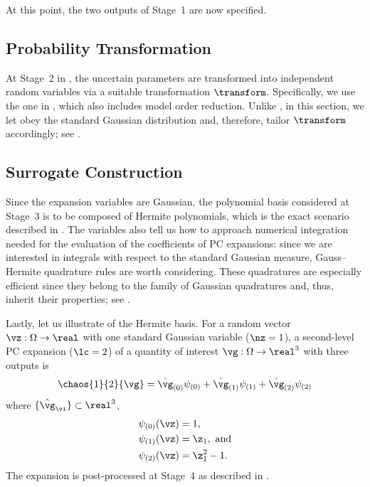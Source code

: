At this point, the two outputs of Stage~1 are now specified.

\subsection{Probability Transformation}

At Stage~2 in , the uncertain parameters \vu are
transformed into independent random variables \vz via a suitable transformation
$\transform$. Specifically, we use the one in ,
which also includes model order reduction. Unlike
, in this section, we let \vz obey the
standard Gaussian distribution and, therefore, tailor $\transform$ accordingly;
see .

\subsection{Surrogate Construction}

Since the expansion variables \vz are Gaussian, the polynomial basis considered
at Stage~3 is to be composed of Hermite polynomials, which is the exact scenario
described in . The variables also tell us how to approach
numerical integration needed for the evaluation of the coefficients of \ac{PC}
expansions: since we are interested in integrals with respect to the standard
Gaussian measure, Gauss--Hermite quadrature rules \cite{maitre2010} are worth
considering. These quadratures are especially efficient since they belong to the
family of Gaussian quadratures and, thus, inherit their properties; see
.

Lastly, let us illustrate of the Hermite basis. For a random vector $\vz: \Omega
\to \real$ with one standard Gaussian variable ($\nz = 1$), a second-level
\ac{PC} expansion ($\lc = 2$) of a quantity of interest $\vg: \Omega \to
\real^3$ with three outputs is
\[
  \chaos{1}{2}{\vg}
  = \hat{\vg}_{(0)} \psi_{(0)}
  + \hat{\vg}_{(1)} \psi_{(1)}
  + \hat{\vg}_{(2)} \psi_{(2)}
\]
where $\{ \hat{\vg}_{\vi} \} \subset \real^3$,
\begin{align*}
  & \psi_{(0)}(\vz) = 1, \\
  & \psi_{(1)}(\vz) = \z_1, \text{ and} \\
  & \psi_{(2)}(\vz) = \z_1^2 - 1.
\end{align*}
The expansion is post-processed at Stage~4 as described in
.
